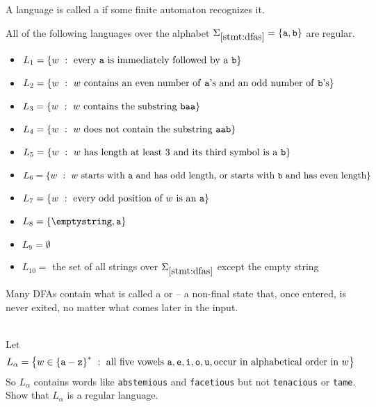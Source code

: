 \documentclass[twoside,letterpaper,openany]{book}
\begin{document}
\begin{defn}
A language is called a  if some finite automaton recognizes it.
\end{defn}

\begin{stmt}\label{stmt:dfas}
All of the following languages over the alphabet $\Sigma_{\ref{stmt:dfas}} = \left\lbrace \texttt{a}, \texttt{b} \right\rbrace$ are regular.
\begin{itemize}
\item $L_1 = \left\lbrace w\ :\ \textrm{every \texttt{a} is immediately followed by a \texttt{b}} \right\rbrace$
\item $L_2 = \left\lbrace w\ :\ w~\textrm{contains an even number of \texttt{a}'s and an odd number of \texttt{b}'s} \right\rbrace$
\item $L_3 = \left\lbrace w\ :\ w~\textrm{contains the substring \texttt{baa}} \right\rbrace$
\item $L_4 = \left\lbrace w\ :\ w~\textrm{does not contain the substring \texttt{aab}} \right\rbrace$
\item $L_5 = \left\lbrace w\ :\ w~\textrm{has length at least 3 and its third symbol is a}~\texttt{b} \right\rbrace$
\item $L_6 = \left\lbrace w\ :\ w~\textrm{starts with \texttt{a} and has odd length, or starts with \texttt{b} and has even length} \right\rbrace$
\item $L_7 = \left\lbrace w\ :\ \textrm{every odd position of}~w~\textrm{is an}~\texttt{a} \right\rbrace$
\item $L_8 = \setdef{\emptystring, \texttt{a}}$
\item $L_9 = \emptyset$
\item $L_{10} = $ the set of all strings over $\Sigma_{\ref{stmt:dfas}}$ except the empty string
\end{itemize}
\end{stmt}

\begin{discussion}
Many DFAs contain what is called a  or  -- a non-final state that, once entered, is never exited, no matter what comes later in the input. 
\end{discussion}

\begin{exer}~\\
Let \[L_\alpha = \setbuild{w \in \setstar{\setdef{\texttt{a} - \texttt{z}}}}{\textrm{all five vowels}\ \texttt{a}, \texttt{e},
			\texttt{i}, \texttt{o}, \texttt{u}, \textrm{occur in alphabetical order in}~w}\]
So $L_\alpha$ contains words like \texttt{abstemious} and \texttt{facetious} but not \texttt{tenacious} or \texttt{tame}. Show that $L_\alpha$ is a regular language.
\end{exer}
\end{document}
